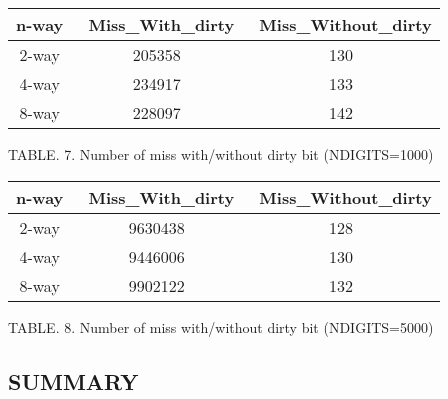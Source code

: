\documentclass{article}
\begin{document}
\begin{CJK*}{UTF8}{bsmi}
\begin{multicols}{2}
\columnbreak

\begin{center}
    \begin{tabular}{|| c c c ||} 
     \hline
     n-way &  \ Miss\_With\_dirty & \ Miss\_Without\_dirty \\ [2ex] 
     \hline\hline
     2-way & 205358 & 130 \\ 
     \hline
     4-way & 234917 & 133 \\ 
     \hline
     8-way & 228097 & 142 \\ 
     \hline
    \end{tabular}
\end{center}

\begin{center}
    \footnotesize TABLE. 7. Number of miss with/without dirty bit  (NDIGITS=1000)
\end{center}

\begin{center}
    \begin{tabular}{|| c c c ||} 
     \hline
     n-way &  \ Miss\_With\_dirty & \ Miss\_Without\_dirty \\ [2ex] 
     \hline\hline
     2-way & 9630438 & 128 \\ 
     \hline
     4-way & 9446006 & 130  \\ 
     \hline
     8-way & 9902122 & 132 \\ 
     \hline
    \end{tabular}
\end{center}

\begin{center}
    \footnotesize TABLE. 8. Number of miss with/without dirty bit  (NDIGITS=5000)
\end{center}


\begin{center}
    \section*{SUMMARY}
\end{center}


\end{multicols}
\end{CJK*}
\end{document}
